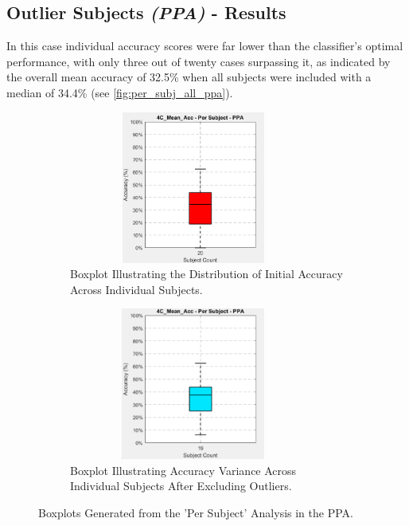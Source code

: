 \subsection{Outlier Subjects \textit{(PPA)} - Results}
\label{subs:res_outliers_ppa}

In this case individual accuracy scores were far lower than the classifier's optimal performance, with only three out of twenty cases surpassing it, as indicated by the overall mean accuracy of 32.5\% when all subjects were included with a median of 34.4\% (see \autoref{fig:per_subj_all_ppa}).

\begin{figure}[htbp]
 	\centering
	\begin{subfigure}{0.49\textwidth}
		\centering
		\includegraphics[width = 0.9\textwidth, height = 5cm]{assets/images/per_subj_4C_20_ppa.png}
		\caption{Boxplot Illustrating the Distribution of Initial Accuracy Across Individual Subjects.}
		\label{fig:per_subj_all_ppa}
	\end{subfigure}
	\hfill
	\begin{subfigure}{0.49\textwidth}
		\centering
	 	\includegraphics[width = 0.9\textwidth, height = 5cm]{assets/images/per_subj_4C_19_ppa.png}
		\caption{Boxplot Illustrating Accuracy Variance Across Individual Subjects After Excluding Outliers.}
		\label{fig:per_subj_19_ppa}
	\end{subfigure}
	\caption[Individual Subjects' Accuracies Boxplots for the PPA]{Boxplots Generated from the 'Per Subject' Analysis in the \gls{PPA}.}
 	\label{fig:per_subj_ppa}
\end{figure}

